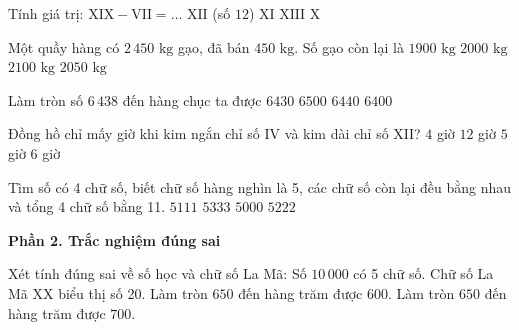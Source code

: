 \begin{ex} %
Tính giá trị: $\text{XIX} - \text{VII} = \dots$
\choice
{\True $\text{XII}$ (số $12$)}
{$\text{XI}$}
{$\text{XIII}$}
{$\text{X}$}
\end{ex}

\begin{ex} %
Một quầy hàng có $2\,450\text{ kg}$ gạo, đã bán $450\text{ kg}$. Số gạo còn lại là
\choice
{$1900\text{ kg}$}
{\True $2000\text{ kg}$}
{$2100\text{ kg}$}
{$2050\text{ kg}$}
\end{ex}

\begin{ex} %
Làm tròn số $6\,438$ đến hàng chục ta được
\choice
{$6430$}
{$6500$}
{\True $6440$}
{$6400$}
\end{ex}

\begin{ex} %
Đồng hồ chỉ mấy giờ khi kim ngắn chỉ số $\text{IV}$ và kim dài chỉ số $\text{XII}$?
\choice
{\True $4$ giờ}
{$12$ giờ}
{$5$ giờ}
{$6$ giờ}
\end{ex}

\begin{ex} %
Tìm số có 4 chữ số, biết chữ số hàng nghìn là 5, các chữ số còn lại đều bằng nhau và tổng 4 chữ số bằng 11.
\choice
{$5111$}
{$5333$}
{$5000$}
{\True $5222$}
\end{ex}

\textbf{Phần 2. Trắc nghiệm đúng sai}

\begin{ex} %
Xét tính đúng sai về số học và chữ số La Mã:
\choiceTF
{\True Số $10\,000$ có 5 chữ số.}
{\True Chữ số La Mã $\text{XX}$ biểu thị số 20.}
{Làm tròn $650$ đến hàng trăm được $600$.}
{\True Làm tròn $650$ đến hàng trăm được $700$.}
\end{ex}

